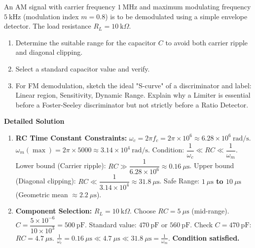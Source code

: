 \documentclass[11pt]{article}
\begin{document}
\begin{exoresolu}
An AM signal with carrier frequency $1\ \mathrm{MHz}$ and maximum modulating frequency $5\ \mathrm{kHz}$ (modulation index $m=0.8$) is to be demodulated using a simple envelope detector. The load resistance $R_L = 10\ \mathrm{k}\Omega$.
\begin{enumerate}
\item Determine the suitable range for the capacitor $C$ to avoid both carrier ripple and diagonal clipping.
\item Select a standard capacitor value and verify.
\item For FM demodulation, sketch the ideal "S-curve" of a discriminator and label: Linear region, Sensitivity, Dynamic Range. Explain why a Limiter is essential before a Foster-Seeley discriminator but not strictly before a Ratio Detector.
\end{enumerate}
\tcblower
\textbf{Detailed Solution}
\begin{enumerate}
\item \textbf{RC Time Constant Constraints:}
$\omega_c = 2\pi f_c = 2\pi \times 10^6 \approx 6.28 \times 10^6\ \mathrm{rad/s}$.
$\omega_m(\max) = 2\pi \times 5000 \approx 3.14 \times 10^4\ \mathrm{rad/s}$.
Condition: $\dfrac{1}{\omega_c} \ll RC \ll \dfrac{1}{\omega_m}$.
Lower bound (Carrier ripple): $RC \gg \dfrac{1}{6.28 \times 10^6} \approx 0.16\ \mu\mathrm{s}$.
Upper bound (Diagonal clipping): $RC \ll \dfrac{1}{3.14 \times 10^4} \approx 31.8\ \mu\mathrm{s}$.
Safe Range: \textbf{$1\ \mu\mathrm{s}$ to $10\ \mu\mathrm{s}$} (Geometric mean $\approx 2.2\ \mu\mathrm{s}$).

\item \textbf{Component Selection:}
$R_L = 10\ \mathrm{k}\Omega$.
Choose $RC = 5\ \mu\mathrm{s}$ (mid-range).
$C = \dfrac{5 \times 10^{-6}}{10 \times 10^3} = 500\ \mathrm{pF}$.
Standard value: $470\ \mathrm{pF}$ or $560\ \mathrm{pF}$.
Check $C = 470\ \mathrm{pF}$: $RC = 4.7\ \mu\mathrm{s}$.
$\frac{1}{\omega_c} = 0.16\ \mu\mathrm{s} \ll 4.7\ \mu\mathrm{s} \ll 31.8\ \mu\mathrm{s} = \frac{1}{\omega_m}$. \textbf{Condition satisfied.}


\end{enumerate}
\end{exoresolu}
\end{document}
